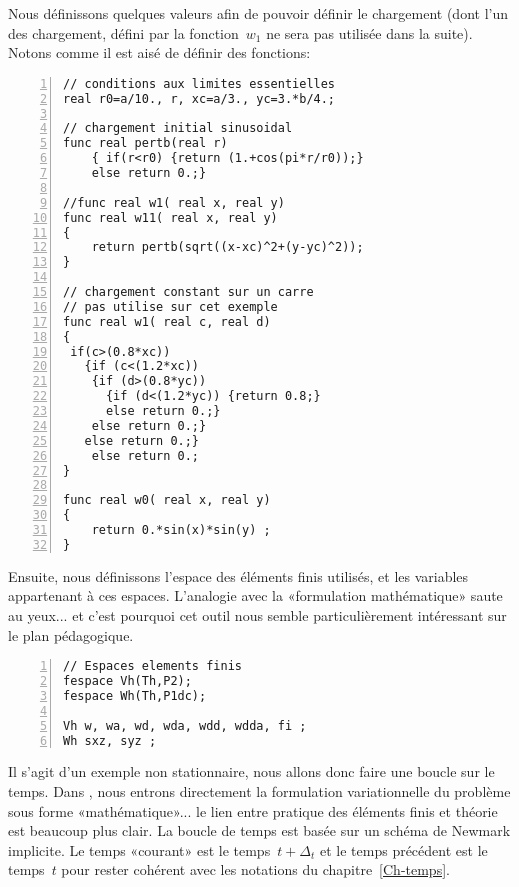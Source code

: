 \medskip
Nous définissons quelques valeurs afin de pouvoir définir le chargement (dont l'un des chargement, défini par la fonction~$w_1$ ne sera pas utilisée dans la suite). Notons comme il est aisé de définir des fonctions:

\color{gris}\scriptsize
\begin{multicols}{2}
\begin{Verbatim}[numbers=left,numbersep=3pt,firstnumber=last]
// conditions aux limites essentielles 
real r0=a/10., r, xc=a/3., yc=3.*b/4.; 

// chargement initial sinusoidal
func real pertb(real r)
	{ if(r<r0) {return (1.+cos(pi*r/r0));}
	else return 0.;}

//func real w1( real x, real y)
func real w11( real x, real y)
{
	return pertb(sqrt((x-xc)^2+(y-yc)^2)); 
}

// chargement constant sur un carre
// pas utilise sur cet exemple
func real w1( real c, real d)
{
 if(c>(0.8*xc))
   {if (c<(1.2*xc)) 
    {if (d>(0.8*yc))
      {if (d<(1.2*yc)) {return 0.8;}
      else return 0.;}
    else return 0.;}
   else return 0.;}
	else return 0.;
}

func real w0( real x, real y)
{
	return 0.*sin(x)*sin(y) ; 
}
\end{Verbatim}
\end{multicols}
\color{black}\normalsize

\medskip
Ensuite, nous définissons l'espace des éléments finis utilisés, et les variables appartenant à ces espaces. L'analogie avec la «formulation mathématique» saute au yeux... et c'est pourquoi cet outil nous semble particulièrement intéressant sur le plan pédagogique.

\color{gris}\scriptsize
\begin{Verbatim}[numbers=left,numbersep=3pt,firstnumber=last]
// Espaces elements finis 
fespace Vh(Th,P2); 
fespace Wh(Th,P1dc);

Vh w, wa, wd, wda, wdd, wdda, fi ; 
Wh sxz, syz ; 
\end{Verbatim}
\color{black}\normalsize

\medskip
Il s'agit d'un exemple non stationnaire, nous allons donc faire une boucle sur le temps. Dans \freefem, nous entrons directement la formulation variationnelle du problème sous forme «mathématique»... le lien entre pratique des éléments finis et théorie est beaucoup plus clair. La boucle de temps est basée sur un schéma de Newmark implicite. Le temps «courant» est le temps~$t+\Delta_t$ et le temps précédent est le temps~$t$ pour rester cohérent avec les notations du chapitre~\ref{Ch-temps}.

